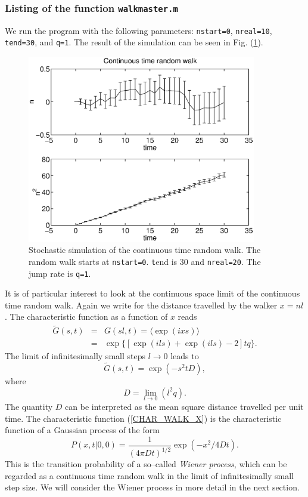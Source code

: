 \subsubsection{Listing of the function \texttt{walkmaster.m}}

We run the program with the following parameters: 
\texttt{nstart=0}, \texttt{nreal=10}, \texttt{tend=30}, and
\texttt{q=1}. The result of the simulation can be seen in
Fig. (\ref{F_CTRW}).
\begin{figure}
\label{F_CTRW}
\includegraphics[width=10cm]{./Figures/f_ctrw.eps}
\caption{Stochastic simulation of the continuous time
random walk. The 
random walk starts at \texttt{nstart=0}.  
{\texttt tend} is 30 and \texttt{nreal=20}.
The jump rate is \texttt{q=1}.}
\end{figure}

It is of particular interest to look at the continuous space limit
of the continuous time random walk. Again we write for the 
distance travelled by the walker $x=nl$. The characteristic
function as a function of $x$ reads
\begin{eqnarray*}
\tilde{G}(s,t) &=& G(sl,t) = \langle \exp(ixs) \rangle \\
                &=& \exp\{[\exp(ils) + \exp(ils)-2]tq \}.
\end{eqnarray*}
The limit of infinitesimally small steps $l \longrightarrow 0$ 
leads to
\begin{equation}
\label{CHAR_WALK_X}
\tilde{G}(s,t) = \exp(-s^2tD),
\end{equation}
where
\begin{equation*}
D=\lim_{l\rightarrow 0} (l^2q).
\end{equation*}
The quantity $D$ can be interpreted as the mean square distance 
travelled  per unit time.  The characteristic function (\ref{CHAR_WALK_X})
is the characteristic function of a Gaussian process of the form
\begin{equation*}
P(x,t|0,0) = \frac{1}{(4\pi Dt)^{1/2}} \exp\left( -x^2/4Dt 
\right).
\end{equation*}
This is the transition probability of a so--called {\em Wiener process},
which can be regarded as a continuous time random walk in the 
limit of infinitesimally small step size. We will consider the 
Wiener process in more detail in the next section.

